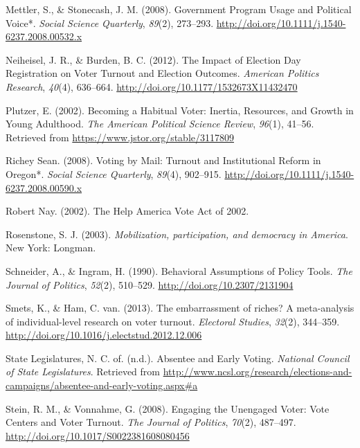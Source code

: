 \documentclass[12pt,twoside]{reedthesis}
\begin{document}
  \hypertarget{ref-mettler_government_2008}{}
  Mettler, S., \& Stonecash, J. M. (2008). Government Program Usage and
  Political Voice*. \emph{Social Science Quarterly}, \emph{89}(2),
  273--293. \url{http://doi.org/10.1111/j.1540-6237.2008.00532.x}
  
  \hypertarget{ref-neiheisel_impact_2012}{}
  Neiheisel, J. R., \& Burden, B. C. (2012). The Impact of Election Day
  Registration on Voter Turnout and Election Outcomes. \emph{American
  Politics Research}, \emph{40}(4), 636--664.
  \url{http://doi.org/10.1177/1532673X11432470}
  
  \hypertarget{ref-plutzer_becoming_2002}{}
  Plutzer, E. (2002). Becoming a Habitual Voter: Inertia, Resources, and
  Growth in Young Adulthood. \emph{The American Political Science Review},
  \emph{96}(1), 41--56. Retrieved from
  \url{https://www.jstor.org/stable/3117809}
  
  \hypertarget{ref-richey_sean_voting_2008}{}
  Richey Sean. (2008). Voting by Mail: Turnout and Institutional Reform in
  Oregon*. \emph{Social Science Quarterly}, \emph{89}(4), 902--915.
  \url{http://doi.org/10.1111/j.1540-6237.2008.00590.x}
  
  \hypertarget{ref-robert_nay_help_2002}{}
  Robert Nay. (2002). The Help America Vote Act of 2002.
  
  \hypertarget{ref-rosenstone_mobilization_2003}{}
  Rosenstone, S. J. (2003). \emph{Mobilization, participation, and
  democracy in America}. New York: Longman.
  
  \hypertarget{ref-schneider_behavioral_1990}{}
  Schneider, A., \& Ingram, H. (1990). Behavioral Assumptions of Policy
  Tools. \emph{The Journal of Politics}, \emph{52}(2), 510--529.
  \url{http://doi.org/10.2307/2131904}
  
  \hypertarget{ref-smets_embarrassment_2013}{}
  Smets, K., \& Ham, C. van. (2013). The embarrassment of riches? A
  meta-analysis of individual-level research on voter turnout.
  \emph{Electoral Studies}, \emph{32}(2), 344--359.
  \url{http://doi.org/10.1016/j.electstud.2012.12.006}
  
  \hypertarget{ref-national_council_of_state_legislatures_absentee_nodate}{}
  State Legislatures, N. C. of. (n.d.). Absentee and Early Voting.
  \emph{National Council of State Legislatures}. Retrieved from
  \url{http://www.ncsl.org/research/elections-and-campaigns/absentee-and-early-voting.aspx\#a}
  
  \hypertarget{ref-stein_engaging_2008}{}
  Stein, R. M., \& Vonnahme, G. (2008). Engaging the Unengaged Voter: Vote
  Centers and Voter Turnout. \emph{The Journal of Politics}, \emph{70}(2),
  487--497. \url{http://doi.org/10.1017/S0022381608080456}
  
\end{document}
